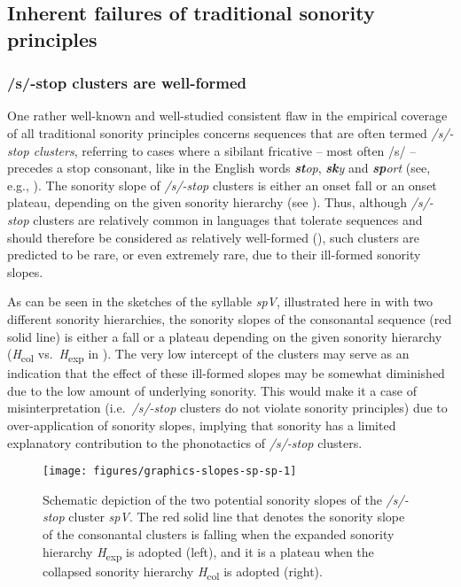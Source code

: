 \subsection{Inherent failures of traditional sonority principles}\label{sec:failures}

\subsubsection{/s/-stop clusters are well-formed}\label{s-stop-clusters-are-well-formed}

One rather well-known and well-studied consistent flaw in the empirical coverage of all traditional sonority principles concerns sequences that are often termed \emph{/s/-stop clusters}, referring to cases where a sibilant fricative -- most often /s/ -- precedes a stop consonant, like in the English words \emph{\textbf{st}op}, \emph{\textbf{sk}y} and \emph{\textbf{sp}ort} (see, e.g., \citealt{fudge1969syllables, goad2011representation, kenstowicz1994phonology, olender2013acousticsk, vaux2009append, wright2004review, yavacs2008sonority}). The sonority slope of \emph{/s/-stop} clusters is either an onset fall or an onset plateau, depending on the given sonority hierarchy (see ). Thus, although \emph{/s/-stop} clusters are relatively common in languages that tolerate sequences and should therefore be considered as relatively well-formed (\citealt{morelli2003relative, steriade1999alternativessk}), such clusters are predicted to be rare, or even extremely rare, due to their ill-formed sonority slopes.

As can be seen in the sketches of the syllable \emph{spV}, illustrated here in  with two different sonority hierarchies, the sonority slopes of the consonantal sequence (red solid line) is either a fall or a plateau depending on the given sonority hierarchy (\emph{H}\textsubscript{col} vs.~\emph{H}\textsubscript{exp} in ). The very low intercept of the clusters may serve as an indication that the effect of these ill-formed slopes may be somewhat diminished due to the low amount of underlying sonority. This would make it a case of misinterpretation (i.e.~\emph{/s/-stop} clusters do not violate sonority principles) due to over-application of sonority slopes, implying that sonority has a limited explanatory contribution to the phonotactics of \emph{/s/-stop} clusters.



\begin{figure}
\texttt{[image: figures/graphics-slopes-sp-sp-1]}
\caption{Schematic depiction of the two potential sonority slopes of the \emph{/s/-stop} cluster \emph{spV}. The red solid line that denotes the sonority slope of the consonantal clusters is falling when 
the expanded sonority hierarchy \emph{H}\textsubscript{exp} is adopted (left), and it is a plateau when 
the collapsed sonority hierarchy \emph{H}\textsubscript{col} is adopted (right).}\label{fig:slopes-sp-sp}
\end{figure}

